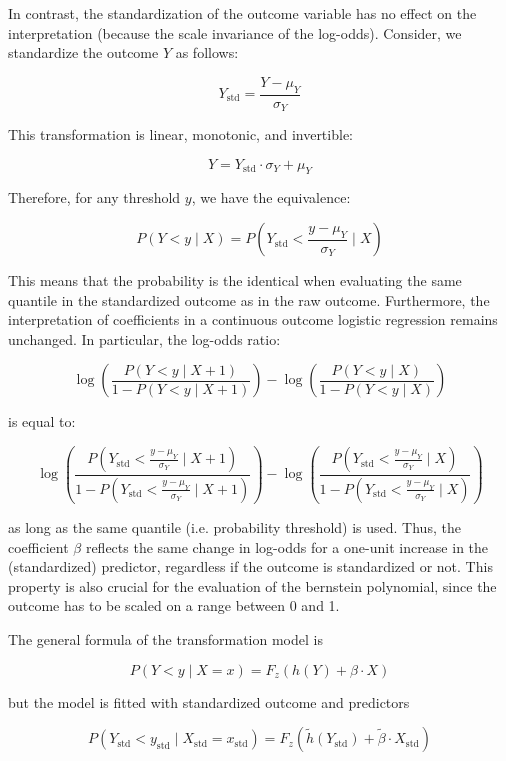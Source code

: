 In contrast, the standardization of the outcome variable has no effect on the interpretation (because the scale invariance of the log-odds). Consider, we standardize the outcome \( Y \) as follows:

\[
Y_{\text{std}} = \frac{Y - \mu_Y}{\sigma_Y}
\]

This transformation is linear, monotonic, and invertible:

\[
Y = Y_{\text{std}} \cdot \sigma_Y + \mu_Y
\]

Therefore, for any threshold \( y \), we have the equivalence:

\[
P(Y < y \mid X) = P\left(Y_{\text{std}} < \frac{y - \mu_Y}{\sigma_Y} \mid X\right)
\]

This means that the probability is the identical when evaluating the same quantile in the standardized outcome as in the raw outcome. Furthermore, the interpretation of coefficients in a continuous outcome logistic regression remains unchanged. In particular, the log-odds ratio:

\[
\log \left( \frac{P(Y < y \mid X + 1)}{1 - P(Y < y \mid X + 1)} \right) -
\log \left( \frac{P(Y < y \mid X)}{1 - P(Y < y \mid X)} \right)
\]

is equal to:

\[
\log \left( \frac{P\left(Y_{\text{std}} < \frac{y - \mu_Y}{\sigma_Y} \mid X + 1\right)}{1 - P\left(Y_{\text{std}} < \frac{y - \mu_Y}{\sigma_Y} \mid X + 1\right)} \right) -
\log \left( \frac{P\left(Y_{\text{std}} < \frac{y - \mu_Y}{\sigma_Y} \mid X\right)}{1 - P\left(Y_{\text{std}} < \frac{y - \mu_Y}{\sigma_Y} \mid X\right)} \right)
\]

as long as the same quantile (i.e. probability threshold) is used. Thus, the coefficient \( \beta \) reflects the same change in log-odds for a one-unit increase in the (standardized) predictor, regardless if the outcome is standardized or not. This property is also crucial for the evaluation of the bernstein polynomial, since the outcome has to be scaled on a range between 0 and 1.


The general formula of the transformation model is

\[
P(Y < y \mid X = x) = F_z\left(h(Y) + \beta \cdot X\right)
\]

but the model is fitted with standardized outcome and predictors

\[
P(Y_{\text{std}} < y_{\text{std}} \mid X_{\text{std}} = x_{\text{std}}) = F_z\left(\tilde{h}(Y_{\text{std}}) + \tilde{\beta} \cdot X_{\text{std}}\right)
\]

